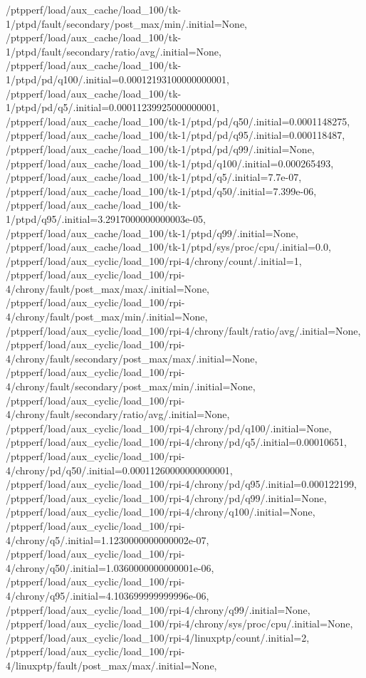 {    /ptpperf/load/aux_cache/load_100/tk-1/ptpd/fault/secondary/post_max/min/.initial=None,
    /ptpperf/load/aux_cache/load_100/tk-1/ptpd/fault/secondary/ratio/avg/.initial=None,
    /ptpperf/load/aux_cache/load_100/tk-1/ptpd/pd/q100/.initial=0.00012193100000000001,
    /ptpperf/load/aux_cache/load_100/tk-1/ptpd/pd/q5/.initial=0.00011239925000000001,
    /ptpperf/load/aux_cache/load_100/tk-1/ptpd/pd/q50/.initial=0.0001148275,
    /ptpperf/load/aux_cache/load_100/tk-1/ptpd/pd/q95/.initial=0.000118487,
    /ptpperf/load/aux_cache/load_100/tk-1/ptpd/pd/q99/.initial=None,
    /ptpperf/load/aux_cache/load_100/tk-1/ptpd/q100/.initial=0.000265493,
    /ptpperf/load/aux_cache/load_100/tk-1/ptpd/q5/.initial=7.7e-07,
    /ptpperf/load/aux_cache/load_100/tk-1/ptpd/q50/.initial=7.399e-06,
    /ptpperf/load/aux_cache/load_100/tk-1/ptpd/q95/.initial=3.2917000000000003e-05,
    /ptpperf/load/aux_cache/load_100/tk-1/ptpd/q99/.initial=None,
    /ptpperf/load/aux_cache/load_100/tk-1/ptpd/sys/proc/cpu/.initial=0.0,
    /ptpperf/load/aux_cyclic/load_100/rpi-4/chrony/count/.initial=1,
    /ptpperf/load/aux_cyclic/load_100/rpi-4/chrony/fault/post_max/max/.initial=None,
    /ptpperf/load/aux_cyclic/load_100/rpi-4/chrony/fault/post_max/min/.initial=None,
    /ptpperf/load/aux_cyclic/load_100/rpi-4/chrony/fault/ratio/avg/.initial=None,
    /ptpperf/load/aux_cyclic/load_100/rpi-4/chrony/fault/secondary/post_max/max/.initial=None,
    /ptpperf/load/aux_cyclic/load_100/rpi-4/chrony/fault/secondary/post_max/min/.initial=None,
    /ptpperf/load/aux_cyclic/load_100/rpi-4/chrony/fault/secondary/ratio/avg/.initial=None,
    /ptpperf/load/aux_cyclic/load_100/rpi-4/chrony/pd/q100/.initial=None,
    /ptpperf/load/aux_cyclic/load_100/rpi-4/chrony/pd/q5/.initial=0.00010651,
    /ptpperf/load/aux_cyclic/load_100/rpi-4/chrony/pd/q50/.initial=0.00011260000000000001,
    /ptpperf/load/aux_cyclic/load_100/rpi-4/chrony/pd/q95/.initial=0.000122199,
    /ptpperf/load/aux_cyclic/load_100/rpi-4/chrony/pd/q99/.initial=None,
    /ptpperf/load/aux_cyclic/load_100/rpi-4/chrony/q100/.initial=None,
    /ptpperf/load/aux_cyclic/load_100/rpi-4/chrony/q5/.initial=1.1230000000000002e-07,
    /ptpperf/load/aux_cyclic/load_100/rpi-4/chrony/q50/.initial=1.0360000000000001e-06,
    /ptpperf/load/aux_cyclic/load_100/rpi-4/chrony/q95/.initial=4.103699999999996e-06,
    /ptpperf/load/aux_cyclic/load_100/rpi-4/chrony/q99/.initial=None,
    /ptpperf/load/aux_cyclic/load_100/rpi-4/chrony/sys/proc/cpu/.initial=None,
    /ptpperf/load/aux_cyclic/load_100/rpi-4/linuxptp/count/.initial=2,
    /ptpperf/load/aux_cyclic/load_100/rpi-4/linuxptp/fault/post_max/max/.initial=None,
}
